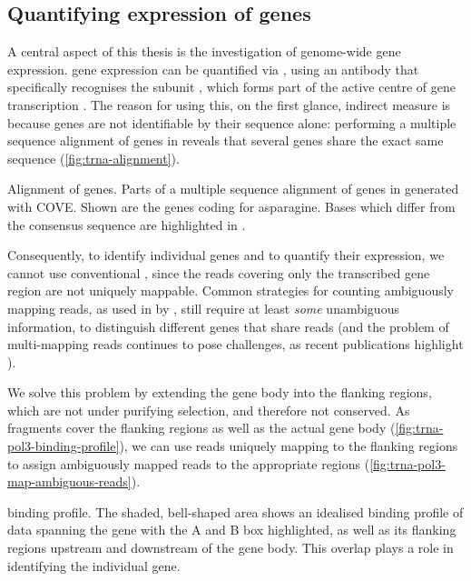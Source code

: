 \subsection{Quantifying expression of  genes}

A central aspect of this thesis is the investigation of genome-wide \trna gene
expression. \trna gene expression can be quantified via  \chipseq, using an
antibody that specifically recognises the  subunit , which
forms part of the active centre of \trna gene transcription
\citep{Ablasser:2009}. The reason for using this, on the first glance, indirect
measure is because \trna genes are not identifiable by their sequence alone:
performing a multiple sequence alignment of \trna genes in \mmu reveals that
several \trna genes share the exact same sequence (\cref{fig:trna-alignment}).

    {\ifoddpage\else\raggedleft\fi%
    \small}
    {Alignment of  genes.}
    {Parts of a multiple sequence alignment of \trna genes in \mmu generated
    with COVE\@. Shown are the \trna genes coding for asparagine. Bases which
    differ from the consensus sequence are highlighted in \primaryname{}.}

Consequently, to identify individual \trna genes and to quantify their
expression, we cannot use conventional \rnaseq, since the \rna reads covering
only the transcribed gene region are not uniquely mappable. Common strategies
for counting ambiguously mapping reads, as used in  by
\citet{Mortazavi:2008}, still require at least \emph{some} unambiguous
information, to distinguish different genes that share reads (and the problem of
multi-mapping reads continues to pose challenges, as recent publications
highlight \citep{Kahles:2015}).

We solve this problem by extending the \trna gene body into the flanking
regions, which are not under purifying selection, and therefore not conserved.
As  \chipseq fragments cover the flanking regions as well as the actual
gene body (\cref{fig:trna-pol3-binding-profile}), we can use reads uniquely
mapping to the flanking regions to assign ambiguously mapped reads to the
appropriate regions (\cref{fig:trna-pol3-map-ambiguous-reads}).

    {\trna {} \chip binding profile.}
    {The shaded, bell-shaped area shows an idealised binding profile of \chipseq
    data spanning the \trna gene with the A and B box highlighted, as well as
    its flanking regions upstream and downstream of the gene body. This overlap
    plays a role in identifying the individual gene.}

